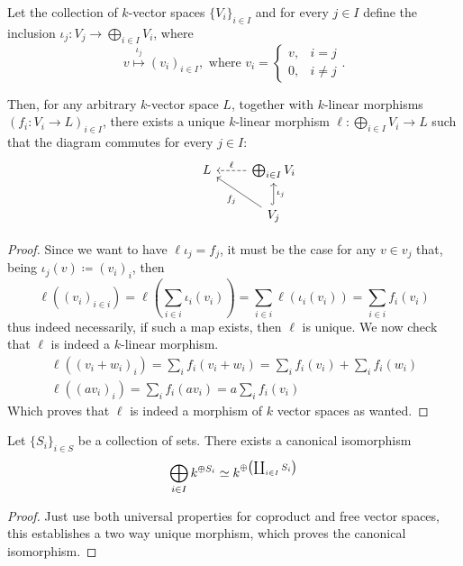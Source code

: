 \begin{proposition}
Let the collection of \(k\)-vector spaces \(\{V_i\}_{i \in I}\) and for every
\(j \in I\) define the inclusion \(\iota_j : V_j \to \bigoplus_{i \in I}
V_i\), where
\[
  v \overset{\iota_j}\longmapsto (v_i)_{i \in I}, \text{ where } v_i =
  \begin{cases}
      v, &i = j \\
      0, &i \neq j
  \end{cases}.
\]

Then, for any arbitrary \(k\)-vector space \(L\), together with \(k\)-linear
morphisms \((f_i : V_i \to L)_{i \in I}\), there exists a unique \(k\)-linear
morphism \(\ell : \bigoplus_{i \in I} V_i \to L\) such that the diagram
commutes for every \(j \in I\):
\[
  \begin{tikzcd}
      &L &\bigoplus_{i \in I} V_i \ar[l, dashed, swap, "\ell"]  \\
      & &V_j \ar[u, hook, swap, "\iota_j"] \ar[ul, "f_j"]
  \end{tikzcd}
\]
\end{proposition}

\begin{proof}
Since we want to have \(\ell  \iota_j = f_j\), it must be the case for
any \(v \in v_j\) that, being \(\iota_j(v) \coloneq (v_i)_i\), then
\[
  \ell((v_i)_{i \in i}) = \ell \left( \sum_{i \in i} \iota_i(v_i) \right) =
  \sum_{i \in i} \ell(\iota_i(v_i)) = \sum_{i \in i} f_i(v_i)
\]
thus indeed necessarily, if such a map exists, then \(\ell\) is unique. We
now check that \(\ell\) is indeed a \(k\)-linear morphism.
\begin{gather*}
  \ell\left( (v_i + w_i)_i \right) = \sum_i f_i(v_i + w_i) = \sum_i f_i(v_i)
  + \sum_i  f_i(w_i) \\
  \ell((av_i)_i) = \sum_i f_i(av_i) = a \sum_i f_i(v_i)
\end{gather*}
Which proves that \(\ell\) is indeed a morphism of \(k\) vector spaces as
wanted.
\end{proof}

\begin{proposition}
Let \(\{S_i\}_{i \in S}\) be a collection of sets. There exists a canonical
isomorphism
\[
\bigoplus_{i \in I} k^{\oplus S_i} \simeq k^{\oplus \left( \coprod_{i \in I}
S_i \right)}
\]
\end{proposition}

\begin{proof}
Just use both universal properties for coproduct and free vector spaces, this
establishes a two way unique morphism, which proves the canonical
isomorphism.
\end{proof}

